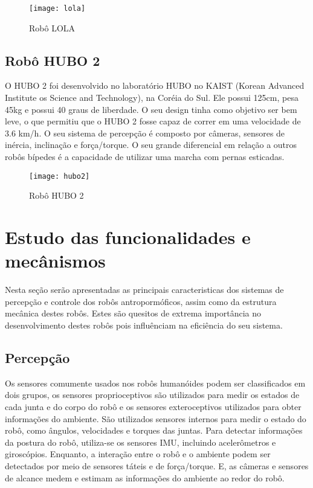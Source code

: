 \begin{figure} [H]
    \centering
    \caption{Robô LOLA}
    \texttt{[image: lola]}
    \label{fig:lola}
\end{figure}

\subsection{Robô HUBO 2}
\label{ssec:hubo}

O HUBO 2 foi desenvolvido no laboratório HUBO no KAIST (Korean Advanced Institute os Science and Technology), na Coréia do Sul. Ele possui 125cm, pesa 45kg e possui 40 graus de liberdade. O seu design tinha como objetivo ser bem leve, o que permitiu que o HUBO 2 fosse capaz de correr em uma velocidade de 3.6 km/h. O seu sistema de percepção é composto por câmeras, sensores de inércia, inclinação e  força/torque. O seu grande diferencial em relação a outros robôs bípedes é a capacidade de utilizar uma marcha com pernas esticadas.

\begin{figure} [H]
    \centering
    \caption{Robô HUBO 2}
    \texttt{[image: hubo2]}
    \label{fig:hubo2}
\end{figure}


\section{Estudo das funcionalidades e mecânismos}
\label{sec:robos}

Nesta seção serão apresentadas as principais caracteristicas dos sistemas de percepção e controle dos robôs antropormóficos, assim como da estrutura mecânica destes robôs. Estes são quesitos de extrema importância no desenvolvimento destes robôs pois influênciam na eficiência do seu sistema.

\subsection{Percepção}
\label{ssec:percepcao}

Os sensores comumente usados nos robôs humanóides podem ser classificados em dois grupos, os sensores proprioceptivos são utilizados para medir os estados de cada junta e do corpo do robô e os sensores exteroceptivos utilizados para obter informações do ambiente. São utilizados sensores internos para medir o estado do robô, como ângulos, velocidades e torques das juntas. Para detectar informações da postura do robô, utiliza-se os sensores IMU, incluindo acelerômetros e giroscópios. Enquanto, a interação entre o robô e o ambiente podem ser detectados por meio de sensores táteis e de força/torque. E, as câmeras e sensores de alcance medem e estimam as informações do ambiente ao redor do robô. 

